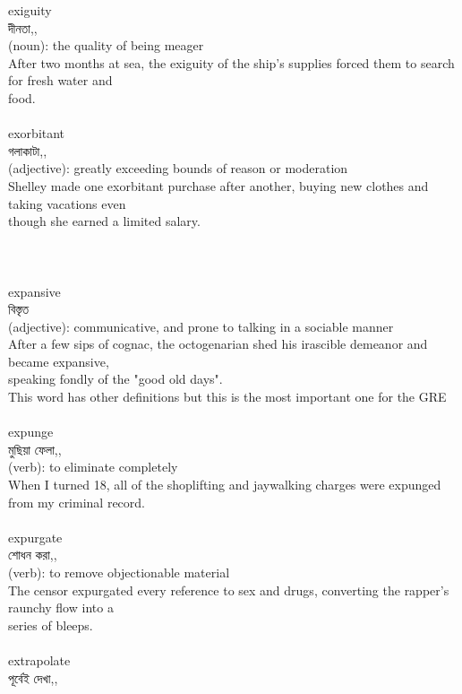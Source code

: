 \documentclass{article}
\begin{document}
{exiguity}\\
{দীনতা,,}\\
{(noun): the quality of being meager\\After two months at sea, the exiguity of the ship's supplies forced them to search for fresh water and\\food.\\}\\
{exorbitant}\\
{গলাকাটা,,}\\
{(adjective): greatly exceeding bounds of reason or moderation\\Shelley made one exorbitant purchase after another, buying new clothes and taking vacations even\\though she earned a limited salary.\\\\                                                                                 \\}\\
{expansive}\\
{বিস্তৃত}\\
{(adjective): communicative, and prone to talking in a sociable manner\\After a few sips of cognac, the octogenarian shed his irascible demeanor and became expansive,\\speaking fondly of the "good old days".\\This word has other definitions but this is the most important one for the GRE\\}\\
{expunge}\\
{মুছিয়া ফেলা,,}\\
{(verb): to eliminate completely\\When I turned 18, all of the shoplifting and jaywalking charges were expunged from my criminal record.\\}\\
{expurgate}\\
{শোধন করা,,}\\
{(verb): to remove objectionable material\\The censor expurgated every reference to sex and drugs, converting the rapper's raunchy flow into a\\series of bleeps.\\}\\
{extrapolate}\\
{পূর্বেই দেখা,,}\\
\end{document}
